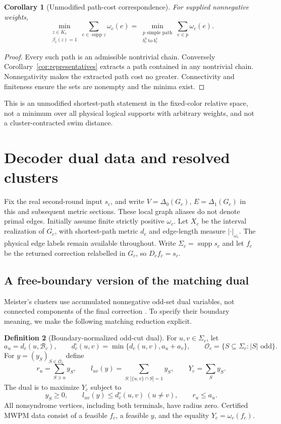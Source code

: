\documentclass[11pt]{article}
\theoremstyle{definition}
\newtheorem{definition}{Definition}[section]
\theoremstyle{plain}
\newtheorem{corollary}[definition]{Corollary}
\theoremstyle{remark}
\begin{document}
\begin{corollary}[Unmodified path-cost correspondence]\label{cor:pathcost}
For supplied nonnegative weights,
\[
 \min_{\substack{z\in K_c\\\beta_c(z)=1}}
       \sum_{e\in\operatorname{supp}z}\omega_c(e)
 =
 \min_{\substack{p\text{ simple path}\\b_c^0\ \mathrm{to}\ b_c^1}}
       \sum_{e\in p}\omega_c(e).
\]
\end{corollary}
\begin{proof}
Every such path is an admissible nontrivial chain.
Conversely Corollary~\ref{cor:representatives} extracts a path contained
in any nontrivial chain. Nonnegativity makes the extracted path cost
no greater. Connectivity and finiteness ensure the sets are nonempty
and the minima exist.
\end{proof}
This is an unmodified shortest-path statement in the fixed-color
relative space, not a minimum over all physical logical supports
with arbitrary weights, and not a cluster-contracted swim distance.

\section{Decoder dual data and resolved clusters}\label{sec:clusters}
Fix the real second-round input $s_c$, and write
$V=\Delta_0(G_c)$, $E=\Delta_1(G_c)$ in this and subsequent metric
sections. These local graph aliases do not denote primal edges.
Initially assume finite strictly positive $\omega_c$.
Let $X_c$ be the interval realization of $G_c$, with shortest-path
metric $d_c$ and edge-length measure $|\cdot|_{\omega_c}$.
The physical edge labels remain available throughout.
Write $\Sigma_c=\operatorname{supp}s_c$ and let $f_c$ be the
returned correction relabelled in $G_c$, so $D_cf_c=s_c$.

\subsection{A free-boundary version of the matching dual}
Meister's clusters use accumulated nonnegative odd-set dual variables,
not connected components of the final correction
\cite[Definition~7, Eq.~(6)]{Meister}. To specify their boundary
meaning, we make the following matching reduction explicit.

\begin{definition}[Boundary-normalized odd-cut dual]\label{def:dual}
For $u,v\in\Sigma_c$, let
\[
 a_u=d_c(u,\mathcal B_c),\qquad
 d_c^\circ(u,v)=\min\{d_c(u,v),a_u+a_v\},\qquad
 \mathcal O_c=\{S\subseteq\Sigma_c:|S|\text{ odd}\}.
\]
For $y=(y_S)_{S\in\mathcal O_c}$ define
\[
 r_u=\sum_{S\ni u}y_S,\qquad
 l_{uv}(y)=\sum_{S:|\{u,v\}\cap S|=1}y_S,\qquad
 Y_c=\sum_S y_S .
\]
The dual is to maximize $Y_c$ subject to
\begin{equation}
 y_S\ge0,\qquad l_{uv}(y)\le d_c^\circ(u,v)\ (u\ne v),\qquad
 r_u\le a_u .
 \label{eq:dual}
\end{equation}
All nonsyndrome vertices, including both terminals, have radius zero.
Certified MWPM data consist of a feasible $f_c$, a feasible $y$, and
the equality $Y_c=\omega_c(f_c)$.
\end{definition}
\end{document}
